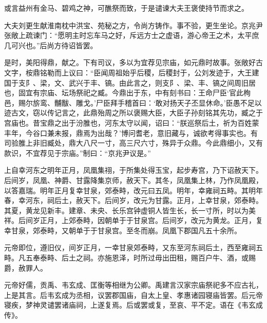 \documentclass[12pt,UTF8]{ctexbook}
\begin{document}
或言益州有金马、碧鸡之神，可醮祭而致，于是谴谏大夫王褒使持节而求之。



大夫刘更生献淮南枕中洪宝、苑秘之方，令尚方铸作。事不验，更生坐论。京兆尹张敞上疏谏门：“愿明主时忘车马之好，斥远方士之虚语，游心帝王之术，太平庶几可兴也。”后尚方待诏皆罢。



是时，美阳得鼎，献之。下有司议，多以为宜荐见宗庙，如元鼎时故事。张敞好古文字，桉鼎铭勒而上议曰：“臣闻周祖始乎后稷，后稷封于，公刘发迹于，大王建国于支阝、梁，文、武兴于丰、镐。由此言之，则支阝、梁、丰、镐之间周旧居也，固宜有宗庙、坛场祭祀之臧。今鼎出于东，中有刻书曰：王命尸臣‘官此栒邑，赐尔旂鸾、黼黻、雕戈。’尸臣拜手稽首曰：‘敢对扬天子丕显休命。’臣愚不足以迹古文，窃以传记言之，此鼎殆周之所以褒赐大臣，大臣子孙刻铭其先功，臧之于宫庙也。昔宝鼎之出于汾脽也，河东太守以闻，诏曰：“朕巡祭后土，祈为百姓蒙丰年，今谷口兼未报，鼎焉为出哉？’博问耆老，意旧藏与，诚欲考得事实也。有司验脽上非旧臧处，鼎大八尺一寸，高三尺六寸，殊异于众鼎。今此鼎细小，又有款识，不宜荐见于宗庙。”制曰：“京兆尹议是。”



上自幸河东之明年正月，凤凰集祤，于所集处得玉宝，起步寿宫，乃下诏赦天下。后间岁，凤凰、神爵、甘露降集京师，赦天下。其冬，凤凰集上林，乃作凤凰殿，以答嘉瑞。明年正月复幸甘泉，郊泰畤，改元曰五凤。明年，幸雍祠五畤。其明年春，幸河东，祠后土，赦天下。后间岁，改元为甘露。正月，上幸甘泉，郊泰畤。其夏，黄龙见新丰。建章、未央、长乐宫钟虚铜人皆生长，长一寸所，时以为美祥。后间岁正月，上郊泰畤，因朝单于于甘泉宫。后间岁，改元为黄龙。正月，复幸甘泉，郊泰畤，又朝单于于甘泉宫。至冬而崩。凤凰下郡国凡五十余所。



元帝即位，遵旧仪，间岁正月，一幸甘泉郊泰畤，又东至河东祠后土，西至雍祠五畤。凡五奉泰畤、后土之祠。亦施恩泽，时所过毋出田租，赐百户牛、酒，或赐爵，赦罪人。



元帝好儒，贡禹、韦玄成、匡衡等相继为公卿。禹建言汉家宗庙祭祀多不应古礼，上是其言。后韦玄成为丞相，议罢郡国庙，自太上皇、孝惠诸园寝庙皆罢。后元帝寝疾，梦神灵谴罢诸庙祠，上遂复焉。后或罢或复，至哀、平不定。语在《韦玄成传》。
\end{document}
